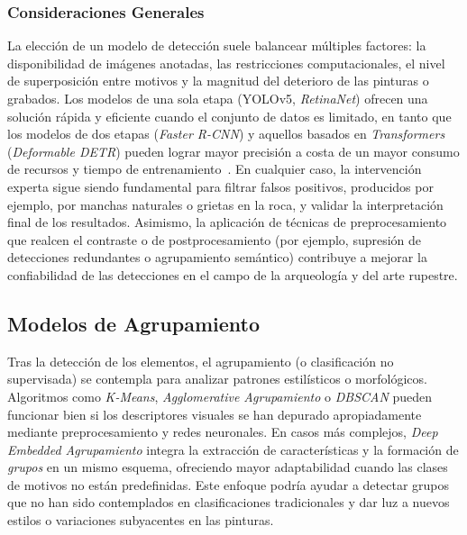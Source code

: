 \subsubsection*{Consideraciones Generales}

La elección de un modelo de detección suele balancear múltiples factores: la disponibilidad de imágenes anotadas, las restricciones computacionales, el nivel de superposición entre motivos y la magnitud del deterioro de las pinturas o grabados.
Los modelos de una sola etapa (YOLOv5, \textit{RetinaNet}) ofrecen una solución rápida y eficiente cuando el conjunto de datos es limitado, en tanto que los modelos de dos etapas (\textit{Faster R-CNN}) y aquellos basados en \textit{Transformers} (\textit{Deformable DETR}) pueden lograr mayor precisión a costa de un mayor consumo de recursos y tiempo de entrenamiento~\cite{horn2022,davis2021,jalandoni2022,li2022,tsigkas2020}.
En cualquier caso, la intervención experta sigue siendo fundamental para filtrar falsos positivos, producidos por ejemplo, por manchas naturales o grietas en la roca, y validar la interpretación final de los resultados.
Asimismo, la aplicación de técnicas de preprocesamiento que realcen el contraste o de postprocesamiento (por ejemplo, supresión de detecciones redundantes o agrupamiento semántico) contribuye a mejorar la confiabilidad de las detecciones en el campo de la arqueología y del arte rupestre.

\subsection{Modelos de Agrupamiento}

Tras la detección de los elementos, el agrupamiento (o clasificación no supervisada) se contempla para analizar patrones estilísticos o morfológicos.
Algoritmos como \textit{K-Means}, \textit{Agglomerative Agrupamiento} o \textit{DBSCAN} pueden funcionar bien si los descriptores visuales se han depurado apropiadamente mediante preprocesamiento y redes neuronales.
En casos más complejos, \textit{Deep Embedded Agrupamiento} integra la extracción de características y la formación de \textit{grupos} en un mismo esquema, ofreciendo mayor adaptabilidad cuando las clases de motivos no están predefinidas.
Este enfoque podría ayudar a detectar grupos que no han sido contemplados en clasificaciones tradicionales y dar luz a nuevos estilos o variaciones subyacentes en las pinturas.

